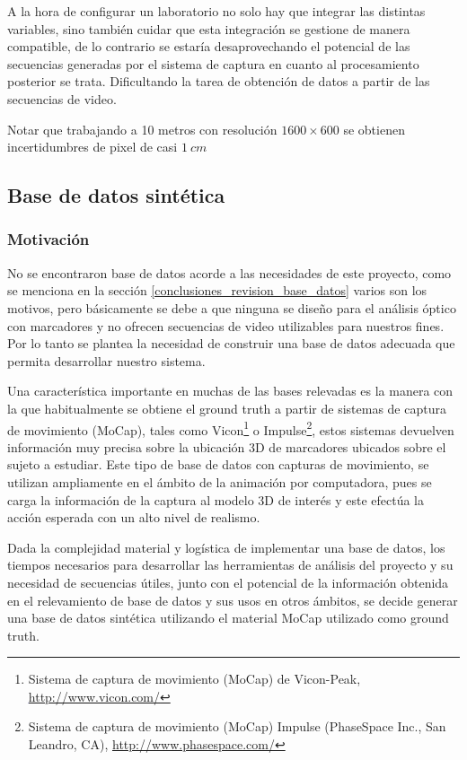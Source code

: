 A la hora de configurar un laboratorio no solo hay que integrar las distintas variables, sino también cuidar que esta integración se gestione de manera compatible, de lo contrario se estaría desaprovechando el potencial de las secuencias generadas por el sistema de captura en cuanto al procesamiento posterior se trata. Dificultando la tarea de obtención de datos a partir de las secuencias de video.

Notar que trabajando a 10 metros con resolución $1600\times600$ se obtienen incertidumbres de pixel de casi $1 ~cm $

\subsection{Base de datos sintética}
\subsubsection{Motivación}

No se encontraron base de datos acorde a las necesidades de este proyecto, como se menciona en la sección \ref{conclusiones_revision_base_datos} varios son los motivos, pero básicamente se debe a que ninguna se diseño para el análisis óptico  con marcadores y no ofrecen secuencias de video utilizables para nuestros fines. Por lo tanto se plantea la necesidad de construir una base de datos adecuada que permita desarrollar nuestro sistema.


Una característica importante en muchas de las bases relevadas es la manera con la que habitualmente se obtiene el ground truth a partir de sistemas de captura de movimiento (MoCap), tales como Vicon\footnote{ Sistema  de captura de movimiento (MoCap) de Vicon-Peak, \textcolor{blue}{\underline{\url{http://www.vicon.com/}}} }
 o Impulse\footnote{ Sistema  de captura de movimiento (MoCap) Impulse (PhaseSpace Inc., San Leandro, CA), \textcolor{blue}{\underline{\url{http://www.phasespace.com/}}} },
estos sistemas devuelven información muy precisa sobre la ubicación 3D de marcadores ubicados sobre el sujeto a estudiar. Este tipo de base de datos con capturas de movimiento, se utilizan ampliamente en el ámbito de la animación por computadora, pues se carga la información de la captura al modelo 3D de interés y este efectúa la acción esperada con un alto nivel de realismo. 


Dada la complejidad material y logística de implementar una base de datos, los tiempos necesarios para desarrollar las herramientas de análisis del proyecto y su necesidad de secuencias útiles, junto con el potencial de la información obtenida en el relevamiento de base de datos y sus usos en otros ámbitos, se decide generar una base de datos sintética utilizando el material MoCap utilizado como ground truth.



